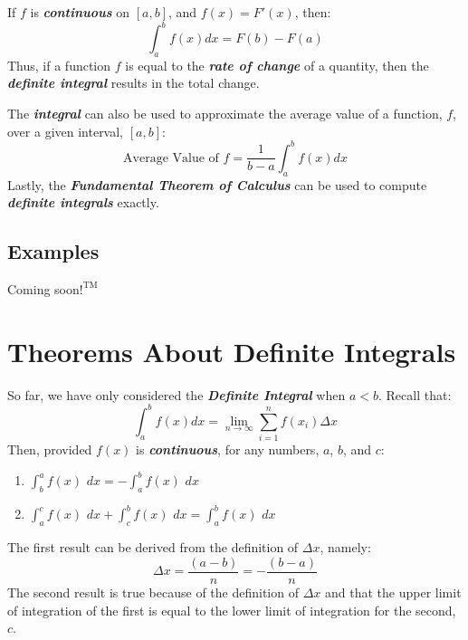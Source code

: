 \vspace{0.2in}
If $f$ is \textbf{\textit{continuous}} on $[a, b]$, and $f(x) = F\prime(x)$, then:
%
\begin{equation}
\int_a^b f(x)dx = F(b) - F(a)
\end{equation}
%
Thus, if a function $f$ is equal to the \textbf{\textit{rate of change}} of a quantity, then the \textbf{\textit{definite integral}} results in the total change.

\vspace{0.1in}
The \textbf{\textit{integral}} can also be used to approximate the average value of a function, $f$, over a given interval, $[a, b]$:
%
\begin{equation}
\text{Average Value of } f = \frac{1}{b-a}\int_a^bf(x)dx
\end{equation}
%
\vspace{0.1in}
Lastly, the \textbf{\textit{Fundamental Theorem of Calculus}} can be used to compute \textbf{\textit{definite integrals}} exactly.

\begin{center}
\section*{\small Examples}
Coming soon$!^{\text{TM}}$
\end{center}

\section{Theorems About Definite Integrals}
So far, we have only considered the \textbf{\textit{Definite Integral}} when $a < b$. Recall that:
%
\begin{equation}
\int_a^b f(x)dx = \lim_{n \rightarrow \infty} \sum_{i=1}^n f\left(x_i\right) \Delta x
\end{equation}
%
Then, provided $f(x)$ is \textbf{\textit{continuous}}, for any numbers, $a$, $b$, and $c$:
%
\begin{enumerate}
\item $\int_b^a f(x)$ $dx = - \int_a^b f(x)$ $dx$\\
\item $\int_a^c f(x)$ $dx + \int_c^b f(x)$ $dx = \int_a^b f(x)$ $dx$
\end{enumerate}
%
The first result can be derived from the definition of $\Delta x$, namely:
%
\begin{equation}
\Delta x = \frac{(a - b)}{n} = -\frac{(b - a)}{n}
\end{equation}
%
The second result is true because of the definition of $\Delta x$ and that the upper limit of integration of the first is equal to the lower limit of integration for the second, $c$.


